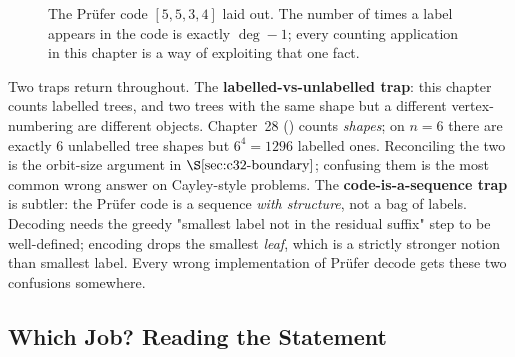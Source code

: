 \begin{figure}[H]
\centering
{}
\caption{The Pr\"ufer code \([5,5,3,4]\) laid out.  The number of times a
label appears in the code is exactly \(\deg-1\); every counting application in
this chapter is a way of exploiting that one fact.}
\label{fig:c32-code}
\end{figure}

Two traps return throughout.  The \textbf{labelled-vs-unlabelled trap}: this
chapter counts labelled trees, and two trees with the same shape but a
different vertex-numbering are different objects.  Chapter~28 ()
counts \emph{shapes}; on \(n=6\) there are exactly 6 unlabelled tree shapes
but \(6^4=1296\) labelled ones.  Reconciling the two is the orbit-size
argument in \(\secref{c32-boundary}\); confusing them is the most common wrong
answer on Cayley-style problems.  The \textbf{code-is-a-sequence trap} is
subtler: the Pr\"ufer code is a sequence \emph{with structure}, not a bag of
labels.  Decoding needs the greedy "smallest label not in the residual
suffix" step to be well-defined; encoding drops the smallest \emph{leaf},
which is a strictly stronger notion than smallest label.  Every wrong
implementation of Pr\"ufer decode gets these two confusions somewhere.

\subsection*{Which Job? Reading the Statement}


